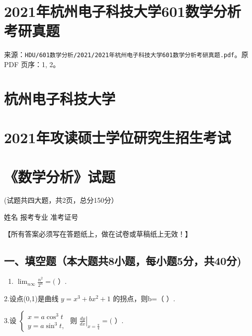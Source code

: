 \documentclass[11pt,fontset=fandol]{ctexart}
\providecommand{\tightlist}{\setlength{\itemsep}{0pt}\setlength{\parskip}{0pt}}
\begin{document}
\section{2021年杭州电子科技大学601数学分析考研真题}\label{ux5e74ux676dux5ddeux7535ux5b50ux79d1ux6280ux5927ux5b66601ux6570ux5b66ux5206ux6790ux8003ux7814ux771fux9898}

来源：\texttt{HDU/601数学分析/2021/2021年杭州电子科技大学601数学分析考研真题.pdf}。原
PDF 页序：1, 2。

\section{杭州电子科技大学}\label{ux676dux5ddeux7535ux5b50ux79d1ux6280ux5927ux5b66}

\section{2021年攻读硕士学位研究生招生考试}\label{ux5e74ux653bux8bfbux7855ux58ebux5b66ux4f4dux7814ux7a76ux751fux62dbux751fux8003ux8bd5}

\section{《数学分析》试题}\label{ux6570ux5b66ux5206ux6790ux8bd5ux9898}

(试题共四大题，共2页，总分150分）

姓名 报考专业 准考证号

【所有答案必须写在答题纸上，做在试卷或草稿纸上无效！】

\subsection{一、填空题（本大题共8小题，每小题5分，共40分)}\label{ux4e00ux586bux7a7aux9898ux672cux5927ux9898ux51718ux5c0fux9898ux6bcfux5c0fux98985ux5206ux517140ux5206}

\begin{enumerate}
\def\labelenumi{\arabic{enumi}.}
\tightlist
\item
  \(\lim _ { n  \infty } \frac { n ^ { 2 } } { 2 ^ { n } } = (\) ）.
\end{enumerate}

2.设点(0,1)是曲线 \(y = x ^ { 3 } + b x ^ { 2 } + 1\) 的拐点，则b=（ ）.

3.设
\(\left\{ \begin{array} { l } { x = a \cos ^ { 3 } t } \\ { y = a \sin ^ { 3 } t , } \end{array} \right.\)
则
\(\left. { \frac { d y } { d x } } \right| _ { x = \frac { \pi } { 4 } } = (\)
）.
\end{document}
